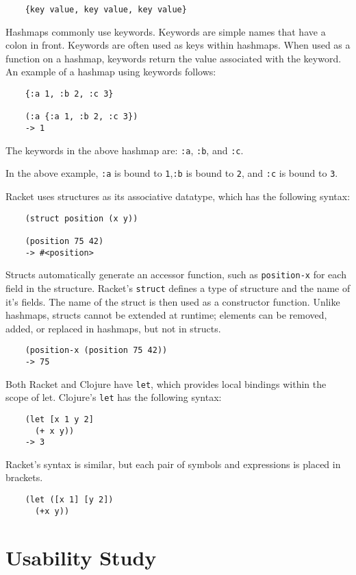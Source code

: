 \documentclass[12pt]{article}
\begin{document}
\begin{verbatim}
	{key value, key value, key value}
\end{verbatim}

Hashmaps commonly use keywords. Keywords are simple names that have a colon in front. Keywords are often used as keys within hashmaps. 
When used as a function on a hashmap, keywords return the value associated with the keyword. 
An example of a hashmap using keywords follows: 

\begin{verbatim}
	{:a 1, :b 2, :c 3}
	
	(:a {:a 1, :b 2, :c 3})
	-> 1
\end{verbatim}

The keywords in the above hashmap are: \texttt{:a}, \texttt{:b}, and \texttt{:c}.

In the above example, \texttt{:a} is bound to \texttt{1},\texttt{:b} is bound to \texttt{2}, and \texttt{:c} is bound to \texttt{3}.


Racket uses structures as its associative datatype, which has the following syntax:
\begin{verbatim}
	(struct position (x y))
	
	(position 75 42)
	-> #<position>
\end{verbatim}
Structs automatically generate an accessor function, such as \texttt{position-x} for each field in the structure. Racket's \texttt{struct} defines a type of structure and the name of it's fields. The name of the struct is then used as a constructor function. Unlike hashmaps, structs cannot be extended at runtime; elements can be removed, added, or replaced in hashmaps, but not in structs.
\begin{verbatim}
	(position-x (position 75 42))
	-> 75
\end{verbatim}

Both Racket and Clojure have \texttt{let}, which provides local bindings within the scope of let. Clojure's \texttt{let} has the following syntax:
\begin{verbatim}
	(let [x 1 y 2]
	  (+ x y))
	-> 3
\end{verbatim}
Racket's syntax is similar, but each pair of symbols and expressions is placed in brackets.
\begin{verbatim}
	(let ([x 1] [y 2])
	  (+x y))
\end{verbatim}

\section{Usability Study}\label{sec:study}
\end{document}
